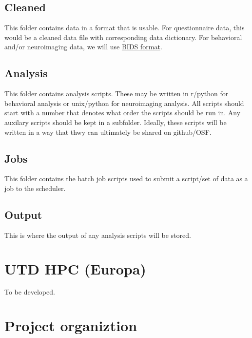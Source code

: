 \documentclass[
]{book}
\begin{document}
\hypertarget{cleaned}{%
\subsection{Cleaned}\label{cleaned}}

This folder contains data in a format that is usable. For questionnaire data, this would be a cleaned data file with corresponding data dictionary. For behavioral and/or neuroimaging data, we will use \href{https://bids.neuroimaging.io/}{BIDS format}.

\hypertarget{analysis}{%
\subsection{Analysis}\label{analysis}}

This folder contains analysis scripts. These may be written in r/python for behavioral analysis or unix/python for neuroimaging analysis. All scripts should start with a number that denotes what order the scripts should be run in. Any auxilary scripts should be kept in a subfolder. Ideally, these scripts will be written in a way that thwy can ultimately be shared on github/OSF.

\hypertarget{jobs}{%
\subsection{Jobs}\label{jobs}}

This folder contains the batch job scripts used to submit a script/set of data as a job to the scheduler.

\hypertarget{output}{%
\subsection{Output}\label{output}}

This is where the output of any analysis scripts will be stored.

\hypertarget{utd-hpc-europa}{%
\section{UTD HPC (Europa)}\label{utd-hpc-europa}}

To be developed.

\hypertarget{project-organiztion}{%
\section{Project organiztion}\label{project-organiztion}}
\end{document}
